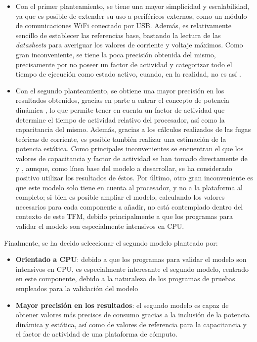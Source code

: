 \begin{itemize}
    \item Con el primer planteamiento, se tiene una mayor simplicidad y escalabilidad, ya que es posible de extender su uso a periféricos externos, como un módulo de comunicaciones \ac{WiFi} conectado por \ac{USB}. Además, es relativamente sencillo de establecer las referencias base, bastando la lectura de las \textit{datasheets} para averiguar los valores de corriente y voltaje máximos. Como gran inconveniente, se tiene la poca precisión obtenida del mismo, precisamente por no poseer un factor de actividad y categorizar todo el tiempo de ejecución como estado activo, cuando, en la realidad, no es así \cite{antoniomateo}.

    \item Con el segundo planteamiento, se obtiene una mayor precisión en los resultados obtenidos, gracias en parte a entrar el concepto de potencia dinámica \cite{soton393728} \cite{soton418538}, lo que permite tener en cuenta un factor de actividad que determine el tiempo de actividad relativo del procesador, así como la capacitancia del mismo. Además, gracias a los cálculos realizados de las fugas teóricas de corriente, es posible también realizar una estimación de la potencia estática. Como principales inconvenientes se encuentran el que los valores de capacitancia y factor de actividad se han tomado directamente de \cite{soton393728} y \cite{soton418538}, aunque, como línea base del modelo a desarrollar, se ha considerado positivo utilizar los resultados de éstos. Por último, otro gran inconveniente es que este modelo solo tiene en cuenta al procesador, y no a la plataforma al completo; si bien es posible ampliar el modelo, calculando los valores necesarios para cada componente a añadir, no está contemplado dentro del contexto de este \ac{TFM}, debido principalmente a que los programas para validar el modelo son especialmente intensivos en \ac{CPU}. \\
\end{itemize}

Finalmente, se ha decido seleccionar el segundo modelo planteado por:

\begin{itemize}
    \item \textbf{Orientado a \ac{CPU}}: debido a que los programas para validar el modelo son intensivos en \ac{CPU}, es especialmente interesante el segundo modelo, centrado en este componente, debido a la naturaleza de los programas de pruebas empleados para la validación del modelo

    \item \textbf{Mayor precisión en los resultados}: el segundo modelo es capaz de obtener valores más precisos de consumo gracias a la inclusión de la potencia dinámica y estática, así como de valores de referencia para la capacitancia y el factor de actividad de una plataforma de cómputo. \\
\end{itemize}

